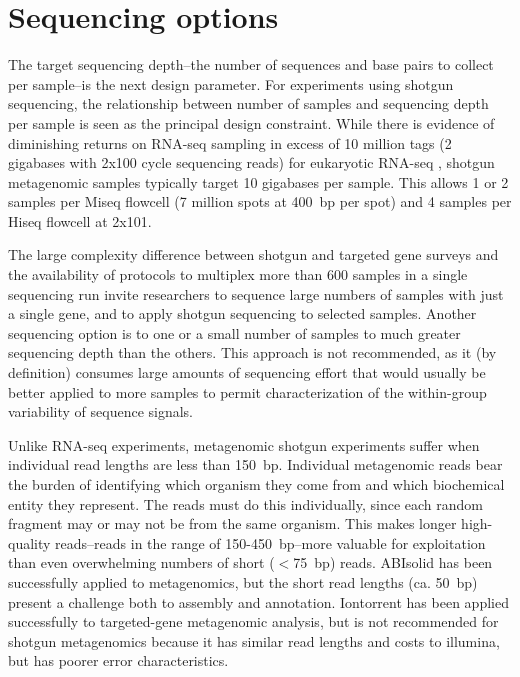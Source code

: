 \documentclass[graybox]{svmult}
\begin{document}
\section{Sequencing options }
\label{sec:2}
%

The target sequencing depth--the number of sequences and base pairs to collect per sample--is the next design parameter.  For experiments using shotgun sequencing, the relationship between number of samples and sequencing depth per sample is seen as the principal design constraint. \cite{Auer2010Statistical}    While there is evidence of diminishing returns on RNA-seq sampling in excess of 10 million tags (2 gigabases with 2x100 cycle sequencing reads) for eukaryotic RNA-seq \cite{Wang2011Evaluation}, shotgun metagenomic samples typically target 10 gigabases per sample.     This allows 1 or 2 samples per Miseq flowcell  (7 million spots at 400~bp per spot) and 4 samples per Hiseq flowcell at 2x101.

The large complexity difference between shotgun and targeted gene surveys and the availability of protocols to multiplex more than 600 samples in a single sequencing run invite researchers to sequence large numbers of samples with just a single gene, and to apply shotgun sequencing to selected samples.   Another sequencing option is to one or a small number of samples to much greater sequencing depth than the others.  This approach is not recommended, as it (by definition) consumes large amounts of sequencing effort that would usually be better applied to more samples to permit characterization of the within-group variability of sequence signals.

Unlike RNA-seq experiments, metagenomic shotgun experiments suffer when individual read lengths are less than 150~bp.  Individual metagenomic reads bear the burden of identifying which organism they come from and which biochemical entity they represent.  The reads must do this individually, since each random fragment may or may not be from the same organism.  This makes longer high-quality reads--reads in the range of 150-450~bp--more valuable for exploitation than even overwhelming numbers of short ($<$75~bp) reads.   
ABIsolid has been successfully applied to metagenomics\cite{Iverson2012Untangling}, but the short read lengths (ca. 50~bp) present a challenge both to assembly and annotation.
Iontorrent has been applied successfully to targeted-gene metagenomic analysis, but is not recommended for shotgun metagenomics because it has similar read lengths and costs to illumina, but has poorer error characteristics.
\end{document}
